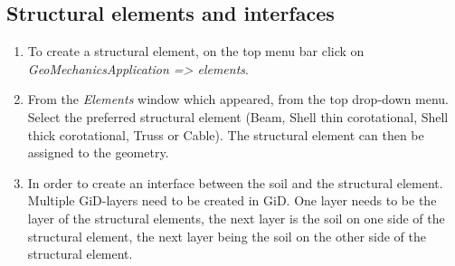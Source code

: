 \begin{enumerate}
\end{enumerate}

\subsection{Structural elements and interfaces}
\begin{enumerate}
	\item To create a structural element, on the top menu bar click on \textit{GeoMechanicsApplication => elements}. 
	\item From the \textit{Elements} window which appeared, from the top drop-down menu. Select the preferred structural element (Beam, Shell thin corotational, Shell thick corotational, Truss or Cable). The structural element can then be assigned to the geometry.
	\item In order to create an interface between the soil and the structural element. Multiple GiD-layers need to be created in GiD. One layer needs to be the layer of the structural elements, the next layer is the soil on one side of the structural element, the next layer being the soil on the other side of the structural element.
	 
	
	
\end{enumerate}

